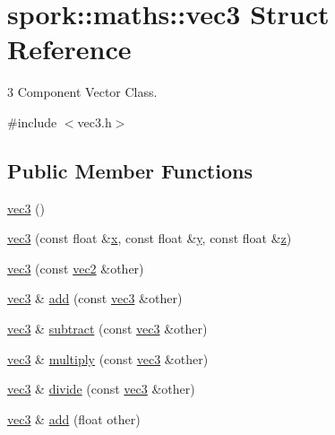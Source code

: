 \hypertarget{structspork_1_1maths_1_1vec3}{}\section{spork\+:\+:maths\+:\+:vec3 Struct Reference}
\label{structspork_1_1maths_1_1vec3}


3 Component Vector Class.  




{\ttfamily \#include $<$vec3.\+h$>$}

\subsection*{Public Member Functions}
\begin{DoxyCompactItemize}
\item 
\hyperlink{structspork_1_1maths_1_1vec3_ac62b81dad4278a33b9109cf01fb41de7}{vec3} ()
\item 
\hyperlink{structspork_1_1maths_1_1vec3_aadbaef4db4a93f68a07c548582b973f0}{vec3} (const float \&\hyperlink{structspork_1_1maths_1_1vec3_a0ad9ff5d633e78698328da4697e6429c}{x}, const float \&\hyperlink{structspork_1_1maths_1_1vec3_a52923b4784782eef93946328931a30cc}{y}, const float \&\hyperlink{structspork_1_1maths_1_1vec3_ac6c368d1e1e30be899a7e02cfa55354d}{z})
\item 
\hyperlink{structspork_1_1maths_1_1vec3_a3b726e25a7ed93b65c272770b2c621b2}{vec3} (const \hyperlink{structspork_1_1maths_1_1vec2}{vec2} \&other)
\item 
\hyperlink{structspork_1_1maths_1_1vec3}{vec3} \& \hyperlink{structspork_1_1maths_1_1vec3_ad498565117555b43d62cd6f94fcb7d79}{add} (const \hyperlink{structspork_1_1maths_1_1vec3}{vec3} \&other)
\item 
\hyperlink{structspork_1_1maths_1_1vec3}{vec3} \& \hyperlink{structspork_1_1maths_1_1vec3_ae2866e51829d78e72eb2e2c4b053e951}{subtract} (const \hyperlink{structspork_1_1maths_1_1vec3}{vec3} \&other)
\item 
\hyperlink{structspork_1_1maths_1_1vec3}{vec3} \& \hyperlink{structspork_1_1maths_1_1vec3_ad4cbb6857f71f0cda66f6a1f3d794c6b}{multiply} (const \hyperlink{structspork_1_1maths_1_1vec3}{vec3} \&other)
\item 
\hyperlink{structspork_1_1maths_1_1vec3}{vec3} \& \hyperlink{structspork_1_1maths_1_1vec3_a401010d532b9cc509ba8808f2b5bdd21}{divide} (const \hyperlink{structspork_1_1maths_1_1vec3}{vec3} \&other)
\item 
\hyperlink{structspork_1_1maths_1_1vec3}{vec3} \& \hyperlink{structspork_1_1maths_1_1vec3_aba6c94c85a9a1bd500c5c2e78da49a3a}{add} (float other)

\end{DoxyCompactItemize}
